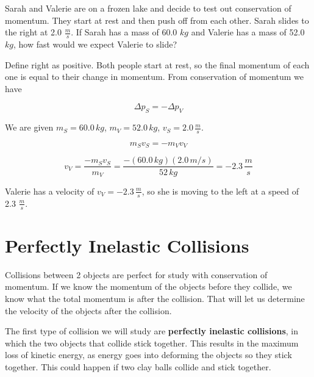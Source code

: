 \documentclass[12pt]{book}
\begin{document}
\begin{exampleblock}

Sarah and Valerie are on a frozen lake and decide to test out conservation of momentum. They start at rest and then push off from each other. Sarah slides to the right at 2.0 $\frac{m}{s}$. If Sarah has a mass of 60.0 $kg$ and Valerie has a mass of 52.0 $kg$, how fast would we expect Valerie to slide?

\hspace{10pt}

Define right as positive. Both people start at rest, so the final momentum of each one is equal to their change in momentum. From conservation of momentum we have

\begin{equation}
\Delta p_S = -\Delta p_V
\end{equation}

We are given $m_S = 60.0 \, kg$, $m_V = 52.0 \, kg$, $v_S = 2.0 \, \frac{m}{s}$. 

\begin{equation}
m_S v_S = -m_V v_V 
\end{equation}

\begin{equation}
v_V = \frac{-m_S v_S}{m_V} = \frac{-(60.0 \, kg)(2.0 \, m/s)}{52 \, kg} = -2.3 \, \frac{m}{s}
\end{equation}

Valerie has a velocity of $v_V = -2.3 \, \frac{m}{s}$, so she is moving to the left at a speed of 2.3 $\frac{m}{s}$.

\end{exampleblock}

\section{Perfectly Inelastic Collisions}

Collisions between 2 objects are perfect for study with conservation of momentum. If we know the momentum of the objects before they collide, we know what the total momentum is after the collision. That will let us determine the velocity of the objects after the collision.

The first type of collision we will study are \textbf{perfectly inelastic collisions}, in which the two objects that collide stick together. This results in the maximum loss of kinetic energy, as energy goes into deforming the objects so they stick together. This could happen if two clay balls collide and stick together. 
\end{document}
